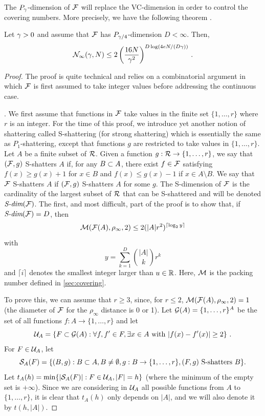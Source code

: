 The $P_\gamma$-dimension of ${\mathcal F}$ will replace the VC-dimension in order to control the covering numbers. More precisely, we have the following theorem \citep{alon1997scale}.
\begin{theorem}
\label{th:p.gamma}
Let $\gamma>0$ and assume that ${\mathcal F}$ has $P_{\gamma/4}$-dimension $D<\infty$. Then,
\[
{\mathcal N}_\infty(\gamma, N) \leq 2 \left(\frac{16N}{\gamma^2}\right)^{D\log(4eN/(D\gamma))}\,.
\] 
\end{theorem}
\begin{proof}
The proof is quite technical and relies on a combinatorial argument in which ${\mathcal F}$ is first assumed to take integer values before addressing the continuous case.  

. We first assume that functions in ${\mathcal F}$ take values in the finite set $\{1, \ldots, r\}$ where $r$ is an integer. For the time of this proof, we introduce yet another notion of shattering called S-shattering (for strong shattering) which is essentially the same as $P_1$-shattering, except that functions $g$ are restricted to take values in $\{1, \ldots, r\}$. Let $A$ be  a finite subset of ${\mathcal R}$. 
Given a function $g: {\mathcal R} \to \{1, \ldots, r\}$, we say that $({\mathcal F}, g)$ S-shatters $A$ if, for any $B\subset A$, there exist $f\in {\mathcal F}$ satisfying $f(x) \geq g(x) + 1$ for $x\in B$ and $f(x) \leq g(x)-1$ if $x\in A\setminus B$. We say that ${\mathcal F}$ S-shatters $A$ if $({\mathcal F},g)$ S-shatters $A$ for some $g$.
The S-dimension of ${\mathcal F}$ is the cardinality of the largest subset of ${\mathcal R}$ that can be S-shattered and will be denoted $\textit{S-dim}({\mathcal F})$. The first, and most difficult, part of the proof is to show that, if $\textit{S-dim}({\mathcal F}) = D$, then
\[
{\mathcal M}({\mathcal F}(A), \rho_\infty, 2) \leq 2(|A|r^2)^{\lceil\log_2 y\rceil}
\]
with 
\[
y = \sum_{k=1}^D \binom{|A|}{k} r^k
\]
and  $\lceil i \rceil$ denotes the smallest integer larger than $u\in {\mathbb{R}}$.
Here, ${\mathcal M}$ is the packing number defined in \cref{sec:covering}.

To prove this, we can assume that $r\geq 3$, since, for $r\leq 2$, ${\mathcal M}({\mathcal F}(A), \rho_\infty, 2)=1$ (the diameter of ${\mathcal F}$ for the $\rho_\infty$ distance is 0 or 1). Let ${\mathcal G}(A) =  \{1, \ldots, r\}^A$ be the set of all functions $f: A \to \{1, \ldots, r\}$ and let
\[
{\mathcal U}_A = \left\{ F\subset {\mathcal G}(A): \forall f,f'\in F, \exists x\in A \text{ with } |f(x) - f'(x)| \geq 2 \right\}\,.
\]
For $F\in {\mathcal U}_A$, let
\[
{\mathcal S}_A(F) = \{(B,g): B\subset A, B\neq \emptyset, g:B\to \{1, \ldots, r\}, (F,g) \text{ S-shatters } B\}.
\]
Let $t_A(h) = \min\{|{\mathcal S}_A(F)|: F\in{\mathcal U}_A, |F| = h\}$ (where the minimum of the empty set is $+\infty$). Since we are considering in ${\mathcal U}_A$ all possible functions from $A$ to $\{1, \ldots, r\}$, it is clear that $t_A(h)$ only depends on $|A|$, and we will also denote it by $t(h, |A|)$. 


\end{proof}
